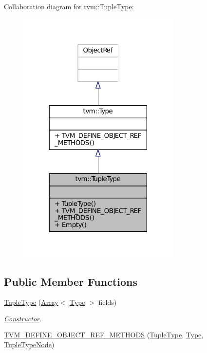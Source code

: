 Collaboration diagram for tvm\+:\+:Tuple\+Type\+:
\nopagebreak
\begin{figure}[H]
\begin{center}
\leavevmode
\includegraphics[width=230pt]{classtvm_1_1TupleType__coll__graph}
\end{center}
\end{figure}
\subsection*{Public Member Functions}
\begin{DoxyCompactItemize}
\item 
\hyperlink{classtvm_1_1TupleType_a6ef62103f4f9392cd04fc23ee989c0f8}{Tuple\+Type} (\hyperlink{classtvm_1_1Array}{Array}$<$ \hyperlink{classtvm_1_1Type}{Type} $>$ fields)
\begin{DoxyCompactList}\small\item\em \hyperlink{classtvm_1_1Constructor}{Constructor}. \end{DoxyCompactList}\item 
\hyperlink{classtvm_1_1TupleType_ab203068248a7e2d316dd6e11bce539d6}{T\+V\+M\+\_\+\+D\+E\+F\+I\+N\+E\+\_\+\+O\+B\+J\+E\+C\+T\+\_\+\+R\+E\+F\+\_\+\+M\+E\+T\+H\+O\+DS} (\hyperlink{classtvm_1_1TupleType}{Tuple\+Type}, \hyperlink{classtvm_1_1Type}{Type}, \hyperlink{classtvm_1_1TupleTypeNode}{Tuple\+Type\+Node})
\end{DoxyCompactItemize}
